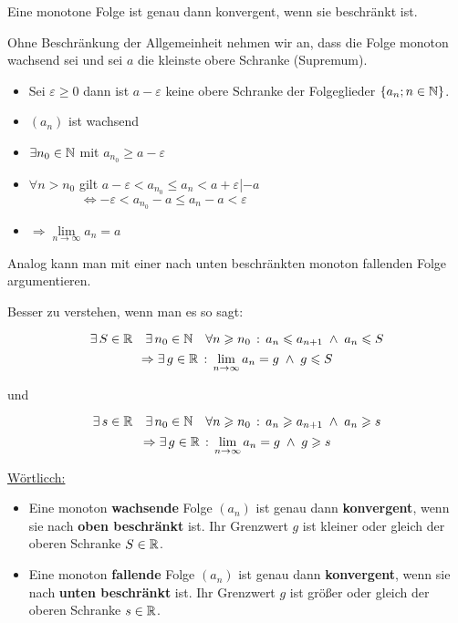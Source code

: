 \documentclass[main.tex]{subfiles}
\begin{document}
\begin{Theorem}
Eine monotone Folge ist genau dann konvergent, wenn sie beschränkt ist.
\end{Theorem}

\begin{Beweis}
Ohne Beschränkung der Allgemeinheit nehmen wir an, dass die Folge monoton wachsend sei und sei $a$ die kleinste obere Schranke (Supremum).
\begin{itemize}
\item Sei $\varepsilon\geq0$ dann ist $a-\varepsilon$ keine obere Schranke der Folgeglieder $\{a_n;n\in\mathbb{N}\}$.
\item $(a_n)$ ist wachsend
\item $\exists n_0\in\mathbb{N}$ mit $a_{n_{0}} \geq a-\varepsilon$
\item $\forall n>n_0$ gilt $a-\varepsilon<a_{n_{0}}\leq a_n<a+\varepsilon$\qquad|$-a$\\
$\qquad\qquad\Leftrightarrow -\varepsilon < a_{n_{0}}-a\leq a_n-a<\varepsilon$
\item $\Rightarrow \lim\limits_{n\to\infty}a_n=a$
\end{itemize}
Analog kann man mit einer nach unten beschränkten monoton fallenden Folge argumentieren.
\end{Beweis}

Besser zu verstehen, wenn man es so sagt:

\begin{Theorem}
$$\exists\, S\in\mathbb{R} \quad \exists \,n_0\in\mathbb{N} \quad \forall n\geqslant n_0\,:\, a_n\leqslant a_{n+1}\; \land \; a_n\leqslant S$$
$$\Rightarrow \exists\, g\in\mathbb{R} \,:\, \lim\limits_{n\to\infty}a_n=g\;\land\; g\leqslant S $$
 \begin{center}und\end{center}
$$\exists \, s\in\mathbb{R} \quad\exists \, n_0\in\mathbb{N} \quad \forall n\geqslant n_0\,:\, a_n\geqslant a_{n+1}\; \land \;a_n\geqslant s$$
$$\Rightarrow \exists \, g\in\mathbb{R} \,:\, \lim\limits_{n\to\infty}a_n=g\;\land\; g\geqslant s$$
\end{Theorem}

	\underline{Wörtlicch:}
\begin{itemize}
\item Eine monoton \textbf{wachsende} Folge $(a_n)$ ist genau dann \textbf{konvergent}, wenn sie nach \textbf{oben beschränkt} ist. Ihr Grenzwert $g$ ist kleiner oder gleich der oberen Schranke $S\in\mathbb{R}$.
\item  Eine monoton \textbf{fallende} Folge $(a_n)$ ist genau dann \textbf{konvergent}, wenn sie nach \textbf{unten beschränkt} ist. Ihr Grenzwert $g$ ist größer oder gleich der oberen Schranke $s\in\mathbb{R}$.
\end{itemize}
\end{document}
